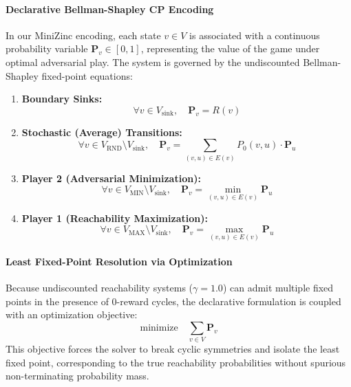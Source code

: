 \documentclass{article}
\begin{document}
\paragraph{Declarative Bellman-Shapley CP Encoding}
In our MiniZinc encoding, each state $v \in V$ is associated with a continuous probability variable $\mathbf{P}_v \in [0, 1]$, representing the value of the game under optimal adversarial play. The system is governed by the undiscounted Bellman-Shapley fixed-point equations:
\begin{enumerate}
    \item \textbf{Boundary Sinks:}
    \begin{equation}
    \forall v \in V_{\text{sink}}, \quad \mathbf{P}_v = R(v)
    \end{equation}
    
    \item \textbf{Stochastic (Average) Transitions:}
    \begin{equation}
    \forall v \in V_{\text{RND}} \setminus V_{\text{sink}}, \quad \mathbf{P}_v = \sum_{(v, u) \in E(v)} P_0(v, u) \cdot \mathbf{P}_u
    \end{equation}
    
    \item \textbf{Player 2 (Adversarial Minimization):}
    \begin{equation}
    \forall v \in V_{\text{MIN}} \setminus V_{\text{sink}}, \quad \mathbf{P}_v = \min_{(v, u) \in E(v)} \mathbf{P}_u
    \end{equation}
    
    \item \textbf{Player 1 (Reachability Maximization):}
    \begin{equation}
    \forall v \in V_{\text{MAX}} \setminus V_{\text{sink}}, \quad \mathbf{P}_v = \max_{(v, u) \in E(v)} \mathbf{P}_u
    \end{equation}
\end{enumerate}

\paragraph{Least Fixed-Point Resolution via Optimization}
Because undiscounted reachability systems ($\gamma = 1.0$) can admit multiple fixed points in the presence of 0-reward cycles, the declarative formulation is coupled with an optimization objective:
\begin{equation}
\text{minimize} \quad \sum_{v \in V} \mathbf{P}_v
\end{equation}
This objective forces the solver to break cyclic symmetries and isolate the least fixed point, corresponding to the true reachability probabilities without spurious non-terminating probability mass.
\end{document}
